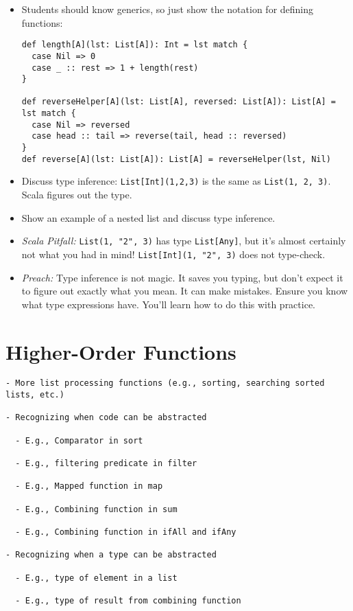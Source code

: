\documentclass{book}
\begin{document}
\begin{itemize}

\item Students should know generics, so just show the notation for defining
functions:
%
\begin{verbatim}
def length[A](lst: List[A]): Int = lst match {
  case Nil => 0
  case _ :: rest => 1 + length(rest)
}

def reverseHelper[A](lst: List[A], reversed: List[A]): List[A] = lst match {
  case Nil => reversed
  case head :: tail => reverse(tail, head :: reversed)
}
def reverse[A](lst: List[A]): List[A] = reverseHelper(lst, Nil)
\end{verbatim}


\item Discuss type inference: \verb|List[Int](1,2,3)| is the same as
\verb|List(1, 2, 3)|. Scala figures out the type.

\item Show an example of a nested list and discuss type inference.

\item \emph{Scala Pitfall:} \verb|List(1, "2", 3)| has type \verb|List[Any]|,
but it's almost certainly not what you had in mind!
\verb|List[Int](1, "2", 3)| does not type-check.

\item \emph{Preach:} Type inference is not magic. It saves you typing, but
don't expect it to figure out exactly what you mean. It can make mistakes.
Ensure you know what type expressions have. You'll learn how to do this
with practice.

\end{itemize}


\section{Higher-Order Functions}

\begin{verbatim}
- More list processing functions (e.g., sorting, searching sorted lists, etc.)

- Recognizing when code can be abstracted

  - E.g., Comparator in sort

  - E.g., filtering predicate in filter

  - E.g., Mapped function in map

  - E.g., Combining function in sum

  - E.g., Combining function in ifAll and ifAny

- Recognizing when a type can be abstracted

  - E.g., type of element in a list

  - E.g., type of result from combining function
\end{verbatim}
\end{document}
